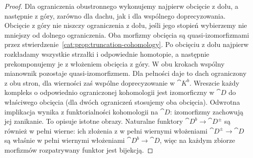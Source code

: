 \begin{proof}
Dla ograniczenia obustronnego wykonujemy najpierw obcięcie z dołu, a następnie z góry, zarówno dla dachu, jak i dla wspólnego doprecyzowania. Obcięcie z góry nie niszczy ograniczenia z dołu, jeśli jego stopień wybierzemy nie mniejszy od dolnego ograniczenia. Oba morfizmy obcięcia są quasi-izomorfizmami przez stwierdzenie~\ref{cat:prop:truncation-cohomology}. Po obcięciu z dołu najpierw rozkładamy wszystkie strzałki i odpowiednie homotopie, a następnie prekomponujemy je z włożeniem obcięcia z góry. W obu krokach wspólny mianownik pozostaje quasi-izomorfizmem. Dla pełności daje to dach ograniczony z obu stron, dla wierności zaś wspólne doprecyzowanie w $\cat K^b$. Wreszcie każdy kompleks o odpowiednio ograniczonej kohomologii jest izomorficzny w $\cat D$ do właściwego obcięcia (dla dwóch ograniczeń stosujemy oba obcięcia). Odwrotna implikacja wynika z funktorialności kohomologii na $\cat D$: izomorfizmy zachowują jej zanikanie. To opisuje istotne obrazy. Naturalne funktory $\cat D^b\to\cat D^\pm$ są również w pełni wierne: ich złożenia z w pełni wiernymi włożeniami $\cat D^\pm\to\cat D$ są właśnie w pełni wiernymi włożeniami $\cat D^b\to\cat D$, więc na każdym zbiorze morfizmów rozpatrywany funktor jest bijekcją.
\end{proof}

